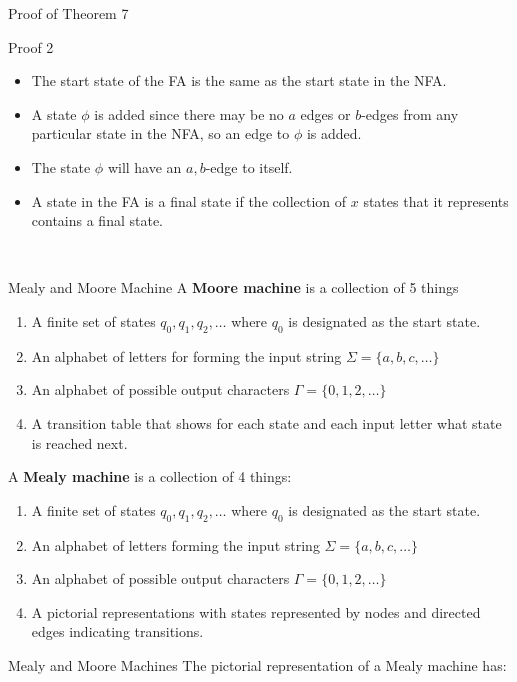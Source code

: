 \documentclass{article}
\begin{document}
\begin{multicols*}{3}
\begin{blackbox}{Proof of Theorem 7}
\begin{pinkbox}{Proof 2}
\begin{itemize}[leftmargin=0.3cm]
            \item The start state of the FA is the same as the start state in the NFA.
            \item A state $\phi$ is added since there may be no $a$ edges or $b$-edges from any particular state in the NFA, so an edge to $\phi$ is added.
            \item The state $\phi$ will have an $a,b$-edge to itself.
            \item A state in the FA is a final state if the collection of $x$ states that it represents contains a final state.
        \end{itemize}
    \end{pinkbox}\\[-2ex]
\end{blackbox}
\begin{blackbox}{Mealy and Moore Machine}
    A \textbf{Moore machine} is a collection of 5 things 
    \begin{enumerate}[leftmargin=7pt]
        \item A finite set of states $q_0, q_1, q_2, \ldots$ where $q_0$ is designated as the start state.
        \item An alphabet of letters for forming the input string $\Sigma = \{a,b,c,\ldots\}$
        \item An alphabet of possible output characters $\Gamma = \{0,1,2,\ldots\}$
        \item A transition table that shows for each state and each input letter what state is reached next.
    \end{enumerate}
    A \textbf{Mealy machine} is a collection of 4 things:
    \begin{enumerate}[leftmargin=7pt]
        \item A finite set of states $q_0, q_1, q_2,\ldots$ where $q_0$ is designated as the start state.
        \item An alphabet of letters forming the input string $\Sigma = \{a,b,c,\ldots\}$
        \item An alphabet of possible output characters $\Gamma = \{0,1,2,\ldots\}$
        \item A pictorial representations with states represented by nodes and directed edges indicating transitions.
    \end{enumerate}
\end{blackbox}
\begin{blackbox}{Mealy and Moore Machines}
    The pictorial representation of a Mealy machine has:

\end{blackbox}
\end{multicols*}
\end{document}
